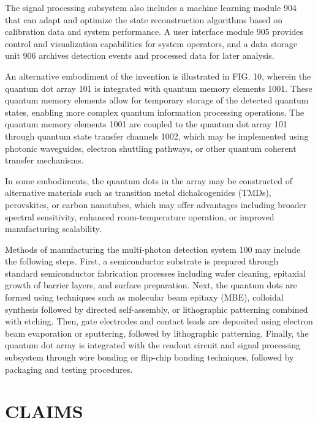 \documentclass[12pt,letterpaper]{article}
\begin{document}
The signal processing subsystem also includes a machine learning module 904 that can adapt and optimize the state reconstruction algorithms based on calibration data and system performance. A user interface module 905 provides control and visualization capabilities for system operators, and a data storage unit 906 archives detection events and processed data for later analysis.

An alternative embodiment of the invention is illustrated in FIG. 10, wherein the quantum dot array 101 is integrated with quantum memory elements 1001. These quantum memory elements allow for temporary storage of the detected quantum states, enabling more complex quantum information processing operations. The quantum memory elements 1001 are coupled to the quantum dot array 101 through quantum state transfer channels 1002, which may be implemented using photonic waveguides, electron shuttling pathways, or other quantum coherent transfer mechanisms.

In some embodiments, the quantum dots in the array may be constructed of alternative materials such as transition metal dichalcogenides (TMDs), perovskites, or carbon nanotubes, which may offer advantages including broader spectral sensitivity, enhanced room-temperature operation, or improved manufacturing scalability.

Methods of manufacturing the multi-photon detection system 100 may include the following steps. First, a semiconductor substrate is prepared through standard semiconductor fabrication processes including wafer cleaning, epitaxial growth of barrier layers, and surface preparation. Next, the quantum dots are formed using techniques such as molecular beam epitaxy (MBE), colloidal synthesis followed by directed self-assembly, or lithographic patterning combined with etching. Then, gate electrodes and contact leads are deposited using electron beam evaporation or sputtering, followed by lithographic patterning. Finally, the quantum dot array is integrated with the readout circuit and signal processing subsystem through wire bonding or flip-chip bonding techniques, followed by packaging and testing procedures.

\newpage
\section*{CLAIMS}

\end{document}
